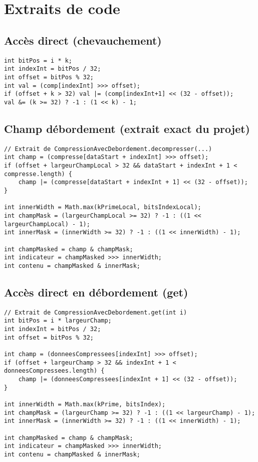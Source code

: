 \section{Extraits de code}
\label{sec:code}

\subsection{Accès direct (chevauchement)}
\begin{lstlisting}
int bitPos = i * k;
int indexInt = bitPos / 32;
int offset = bitPos % 32;
int val = (comp[indexInt] >>> offset);
if (offset + k > 32) val |= (comp[indexInt+1] << (32 - offset));
val &= (k >= 32) ? -1 : (1 << k) - 1;
\end{lstlisting}

\subsection{Champ débordement (extrait exact du projet)}
\begin{lstlisting}
// Extrait de CompressionAvecDebordement.decompresser(...)
int champ = (compresse[dataStart + indexInt] >>> offset);
if (offset + largeurChampLocal > 32 && dataStart + indexInt + 1 < compresse.length) {
	champ |= (compresse[dataStart + indexInt + 1] << (32 - offset));
}

int innerWidth = Math.max(kPrimeLocal, bitsIndexLocal);
int champMask = (largeurChampLocal >= 32) ? -1 : ((1 << largeurChampLocal) - 1);
int innerMask = (innerWidth >= 32) ? -1 : ((1 << innerWidth) - 1);

int champMasked = champ & champMask;
int indicateur = champMasked >>> innerWidth;
int contenu = champMasked & innerMask;
\end{lstlisting}

\subsection{Accès direct en débordement (get)}
\begin{lstlisting}
// Extrait de CompressionAvecDebordement.get(int i)
int bitPos = i * largeurChamp;
int indexInt = bitPos / 32;
int offset = bitPos % 32;

int champ = (donneesCompressees[indexInt] >>> offset);
if (offset + largeurChamp > 32 && indexInt + 1 < donneesCompressees.length) {
	champ |= (donneesCompressees[indexInt + 1] << (32 - offset));
}

int innerWidth = Math.max(kPrime, bitsIndex);
int champMask = (largeurChamp >= 32) ? -1 : ((1 << largeurChamp) - 1);
int innerMask = (innerWidth >= 32) ? -1 : ((1 << innerWidth) - 1);

int champMasked = champ & champMask;
int indicateur = champMasked >>> innerWidth;
int contenu = champMasked & innerMask;
\end{lstlisting}

